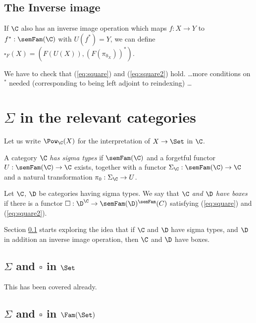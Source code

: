 \documentclass{article}
\begin{document}
\subsection{The Inverse image}
\label{inverseImage}

If $\C$ also has an inverse image operation which maps $f : X
\to Y$ to $f^* : \semFam(\C)$ with $U(f^*) = Y$, we can
define $\square_F(X) = (F(U(X)), (F(\pi_{0_X}))^*)$.

We have to check that (\ref{eq:square}) and (\ref{eq:square2})
hold. \ldots more conditions on $^*$ needed (corresponding to being
left adjoint to reindexing) \ldots

\section{$\Sigma$ in the relevant categories}
Let us write $\Pow_{\C}(X)$ for the interpretation of $X \to \Set$ in
$\C$.

\begin{definition}
  A category $\C$ \emph{has sigma types} if $\semFam(\C)$ and a
  forgetful functor $U : \semFam(\C) \to \C$ exists, together with a
  functor $\Sigma_{\C} : \semFam(\C) \to \C$ and a natural
  transformation $\pi_0 : \Sigma_{\C} \to U$.
\end{definition}

\begin{definition}
  Let $\C$, $\D$ be categories having sigma types.  We say that
  \emph{$\C$ and $\D$ have boxes} if there is a functor $\square :
  \D^{\C} \to \semFam(\D)^\semFam(C)$ satisfying (\ref{eq:square}) and
  (\ref{eq:square2}).
\end{definition}

Section \ref{inverseImage} starts exploring the idea that if $\C$ and
$\D$ have sigma types, and $\D$ in addition an inverse image
operation, then $\C$ and $\D$ have boxes.

\subsection{$\Sigma$ and $\square$ in $\Set$}

This has been covered already. 

\subsection{$\Sigma$ and $\square$ in $\Fam(\Set)$}
\end{document}
